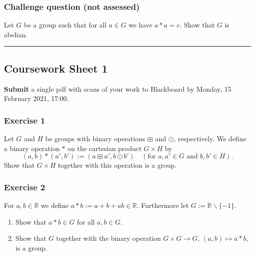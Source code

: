 \documentclass[
  12pt,
  a4paper,
  twoside]{article}
\theoremstyle{plain}
\theoremstyle{definition}
\begin{document}
\hypertarget{challenge-question-not-assessed}{%
\subsubsection*{Challenge question (not assessed)}\label{challenge-question-not-assessed}}

Let \(G\) be a group such that for all \(a\in G\) we have \(a*a=e\). Show that \(G\) is
abelian.

\begin{center}\rule{0.5\linewidth}{0.5pt}\end{center}

\hypertarget{coursework-sheet-1}{%
\subsection{Coursework Sheet 1}\label{coursework-sheet-1}}

\textbf{Submit} a single pdf with scans of your work to Blackboard by Monday, 15 February 2021, 17:00.

\hypertarget{exercise-1-1}{%
\subsubsection*{Exercise 1}\label{exercise-1-1}}

Let \(G\) and \(H\) be groups with binary operations \(\boxplus\) and
\(\odot\), respectively. We define a binary operation \(\ast\)
on the cartesian product \(G \times H\) by
\[(a,b) \ast (a',b') := (a \boxplus a', b \odot b') \quad (\textrm{for }
a,a' \in G \textrm{ and } b,b' \in H).\] Show that \(G\times H\)
together with this operation is a group.

\hypertarget{exercise-2-1}{%
\subsubsection*{Exercise 2}\label{exercise-2-1}}

For \(a, b \in \mathbb{R}\) we define \(a \ast b := a+b+ab \in \mathbb{R}\).
Furthermore let \(G:= \mathbb{R} \backslash \{-1\}\).

\begin{enumerate}
\def\labelenumi{(\alph{enumi})}
\item
  Show that \(a \ast b \in G\) for all \(a, b \in G\).
\item
  Show that \(G\) together with the binary operation \(G \times G \rightarrow G\), \((a, b) \mapsto a \ast b\), is a group.
\end{enumerate}
\end{document}

